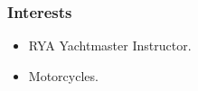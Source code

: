 \documentclass[a4paper, oneside, final, 11pt]{scrartcl} %
\begin{document}
\subsubsection*{Interests}
\begin{itemize}	
 \item RYA Yachtmaster Instructor.
 \item Motorcycles. 
\end{itemize}






\end{document}
